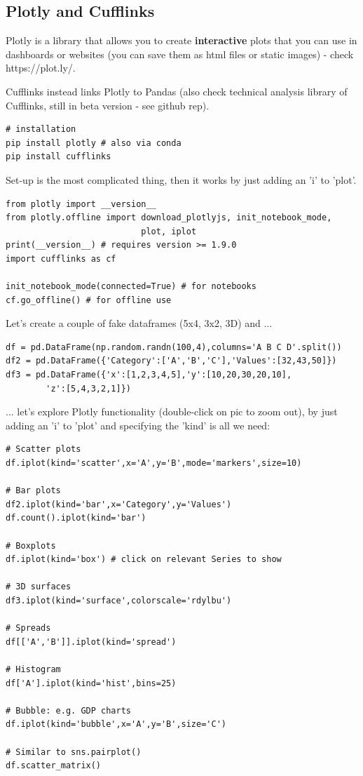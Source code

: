 \documentclass[11pt]{article}
\begin{document}
\subsection{Plotly and Cufflinks}
Plotly is a library that allows you to create \textbf{interactive} plots that you can use in dashboards or websites (you can save them as html files or static images) - check https://plot.ly/. 

Cufflinks instead links Plotly to Pandas (also check technical analysis library of Cufflinks, still in beta version - see github rep).

\begin{lstlisting}
# installation
pip install plotly # also via conda
pip install cufflinks
\end{lstlisting}

Set-up is the most complicated thing, then it works by just adding an 'i' to 'plot'.
\begin{lstlisting}
from plotly import __version__
from plotly.offline import download_plotlyjs, init_notebook_mode, 
                           plot, iplot
print(__version__) # requires version >= 1.9.0
import cufflinks as cf

init_notebook_mode(connected=True) # for notebooks
cf.go_offline() # for offline use
\end{lstlisting}

Let's create a couple of fake dataframes (5x4, 3x2, 3D) and ...
\begin{lstlisting}
df = pd.DataFrame(np.random.randn(100,4),columns='A B C D'.split())
df2 = pd.DataFrame({'Category':['A','B','C'],'Values':[32,43,50]})
df3 = pd.DataFrame({'x':[1,2,3,4,5],'y':[10,20,30,20,10],
		'z':[5,4,3,2,1]})
\end{lstlisting}
... let's explore Plotly functionality (double-click on pic to zoom out), by just adding an 'i' to 'plot' and specifying the 'kind' is all we need:
\begin{lstlisting}
# Scatter plots
df.iplot(kind='scatter',x='A',y='B',mode='markers',size=10) 

# Bar plots
df2.iplot(kind='bar',x='Category',y='Values')
df.count().iplot(kind='bar')

# Boxplots
df.iplot(kind='box') # click on relevant Series to show

# 3D surfaces
df3.iplot(kind='surface',colorscale='rdylbu')

# Spreads
df[['A','B']].iplot(kind='spread')

# Histogram
df['A'].iplot(kind='hist',bins=25)

# Bubble: e.g. GDP charts
df.iplot(kind='bubble',x='A',y='B',size='C')

# Similar to sns.pairplot()
df.scatter_matrix()
\end{lstlisting}
\end{document}
